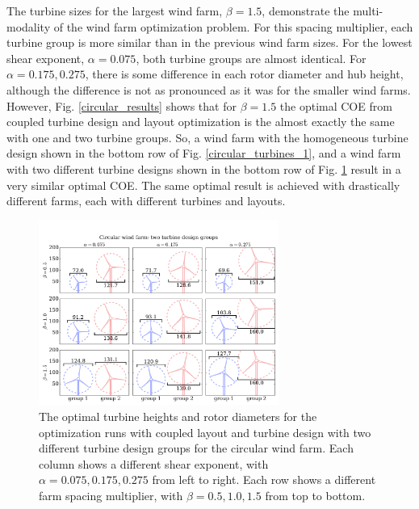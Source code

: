 \documentclass[WESD, manuscript]{copernicus}
\begin{document}
The turbine sizes for the largest wind farm, $\beta=1.5$, demonstrate the multi-modality of the wind farm optimization problem. For this spacing multiplier, each turbine group is more similar than in the previous wind farm sizes. For the lowest shear exponent, $\alpha=0.075$, both turbine groups are almost identical. For $\alpha=0.175,0.275$, there is some difference in each rotor diameter and hub height, although the difference is not as pronounced as it was for the smaller wind farms. However, Fig. \ref{circular_results} shows that for $\beta=1.5$ the optimal COE from coupled turbine design and layout optimization is the almost exactly the same with one and two turbine groups. So, a wind farm with the homogeneous turbine design shown in the bottom row of Fig. \ref{circular_turbines_1}, and a wind farm with two different turbine designs shown in the bottom row of Fig. \ref{circular_turbines} result in a very similar optimal COE. The same optimal result is achieved with drastically different farms, each with different turbines and layouts.  

\begin{figure}[htbp]
  \centering
  \includegraphics[trim={0.5cm 0.3cm 0.3cm 2.75cm},clip,width=0.7\textwidth]{Figures/turbineSizesCircular_2.pdf}
  \caption{\label{circular_turbines} The optimal turbine heights and rotor diameters for the optimization runs with coupled layout and turbine design with two different turbine design groups for the circular wind farm. Each column shows a different shear exponent, with $\alpha=0.075,0.175,0.275$ from left to right. Each row shows a different farm spacing multiplier, with $\beta=0.5,1.0,1.5$ from top to bottom.}
\end{figure}
\end{document}
